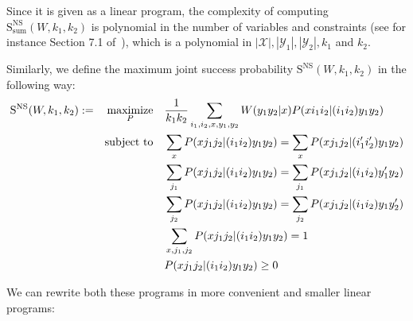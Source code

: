 Since it is given as a linear program, the complexity of computing $\mathrm{S}_{\text{sum}}^{\mathrm{NS}}(W,k_1,k_2)$ is polynomial in the number of variables and constraints (see for instance Section 7.1 of~\cite{GM07}), which is a polynomial in $|\mathcal{X}|,|\mathcal{Y}_1|,|\mathcal{Y}_2|, k_1$ and $k_2$.

Similarly, we define the maximum joint success probability $\mathrm{S}^{\mathrm{NS}}(W,k_1,k_2)$ in the following way:
\begin{equation}
  \begin{aligned}
    \mathrm{S}^{\mathrm{NS}}(W,k_1,k_2) := &&\underset{P}{\operatorname{\text{maximize}}} &&& \frac{1}{k_1k_2}\sum_{i_1,i_2,x,y_1,y_2} W(y_1y_2|x)P(xi_1i_2|(i_1i_2)y_1y_2)\\
    &&\operatorname{\text{subject to}} &&& \sum_{x} P(xj_1j_2|(i_1i_2)y_1y_2) = \sum_{x} P(xj_1j_2|(i_1'i_2')y_1y_2)\\
    &&&&& \sum_{j_1} P(xj_1j_2|(i_1i_2)y_1y_2) = \sum_{j_1} P(xj_1j_2|(i_1i_2)y_1'y_2)\\
    &&&&& \sum_{j_2} P(xj_1j_2|(i_1i_2)y_1y_2) = \sum_{j_2} P(xj_1j_2|(i_1i_2)y_1y_2')\\
    &&&&& \sum_{x,j_1,j_2} P(xj_1j_2|(i_1i_2)y_1y_2) = 1\\
    &&&&& P(xj_1j_2|(i_1i_2)y_1y_2) \geq 0
  \end{aligned}
\end{equation}

We can rewrite both these programs in more convenient and smaller linear programs:

